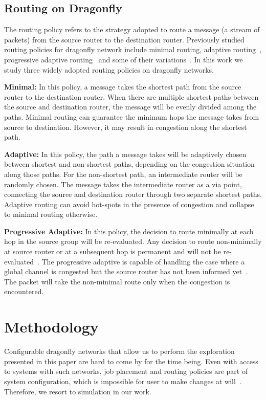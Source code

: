 \documentclass[conference,compsoc]{IEEEtran}
\begin{document}
\subsection{Routing on Dragonfly}
\label{sec:routing-schemes}

The routing policy refers to the strategy adopted to route a message (a stream of packets) from the source router to the destination router. Previously studied routing policies for dragonfly network include minimal routing, adaptive routing~\cite{dally-dragonfly}, progressive adaptive routing~\cite{jiang} and some of their variations~\cite{won-prog-adaptive}. In this work we study three widely adopted routing policies on dragonfly networks.

\textbf{Minimal:} In this policy, a message takes the shortest path from the source router to the destination router. When there are multiple shortest paths between the source and destination router, the message will be evenly divided among the paths. Minimal routing can guarantee the minimum hops the message takes from source to destination. However, it may result in congestion along the shortest path. 

\textbf{Adaptive:} In this policy, the path a message takes will be adaptively chosen between shortest and non-shortest paths, depending on the congestion situation along those paths. For the non-shortest path, an intermediate router will be randomly chosen. The message takes the intermediate router as a via point, connecting the source and destination router through two separate shortest paths. Adaptive routing can avoid hot-spots in the presence of congestion and collapse to minimal routing otherwise. 

\textbf{Progressive Adaptive:} In this policy, the decision to route minimally at each hop in the source group will be re-evaluated. Any decision to route non-minimally at source router or at a subsequent hop is permanent and will not be re-evaluated~\cite{jiang}. The progressive adaptive is capable of handling the case where a global channel is congested but the source router has not been informed yet~\cite{jiang}. The packet will take the non-minimal route only when the congestion is encountered. 



\section{Methodology}
\label{sec: methodology}

Configurable dragonfly networks that allow us to perform the exploration presented in this paper are hard to come by for the time being. Even with access to systems with such networks, job placement and routing policies are part of system configuration, which is impossible for user to make changes at will~\cite{zhou-ipdps-2015}\cite{jain-sc14}\cite{bhatele-sc11}\cite{jokanovic-ipdps-2015}. Therefore, we resort to simulation in our work.
\end{document}
